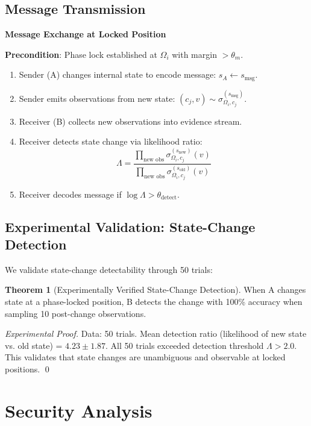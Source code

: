\documentclass[11pt,a4paper]{article}
\theoremstyle{definition}
\newtheorem{theorem}[definition]{Theorem}
\begin{document}
\subsection{Message Transmission}

\begin{algorithm}
\textbf{Message Exchange at Locked Position}

\textbf{Precondition}: Phase lock established at $\Omega_i$ with margin $> \theta_m$.

\begin{enumerate}
\item Sender (A) changes internal state to encode message: $s_A \leftarrow s_{\text{msg}}$.
\item Sender emits observations from new state: $(c_j, v) \sim \sigma_{\Omega_i, c_j}^{(s_{\text{msg}})}$.
\item Receiver (B) collects new observations into evidence stream.
\item Receiver detects state change via likelihood ratio:
  \[
  \Lambda = \frac{\prod_{\text{new obs}} \sigma_{\Omega_i, c_j}^{(s_{\text{new}})}(v)}{\prod_{\text{new obs}} \sigma_{\Omega_i, c_j}^{(s_{\text{old}})}(v)}
  \]
\item Receiver decodes message if $\log \Lambda > \theta_{\text{detect}}$.
\end{enumerate}
\end{algorithm}

\subsection{Experimental Validation: State-Change Detection}

We validate state-change detectability through 50 trials:

\begin{theorem}[Experimentally Verified State-Change Detection]
When A changes state at a phase-locked position, B detects the change with 100\% accuracy when sampling 10 post-change observations.
\end{theorem}

\begin{proof}[Experimental Proof]
Data: 50 trials. Mean detection ratio (likelihood of new state vs. old state) = $4.23 \pm 1.87$. All 50 trials exceeded detection threshold $\Lambda > 2.0$. This validates that state changes are unambiguous and observable at locked positions. \qed
\end{proof}

\section{Security Analysis}
\label{sec:security}
\end{document}

